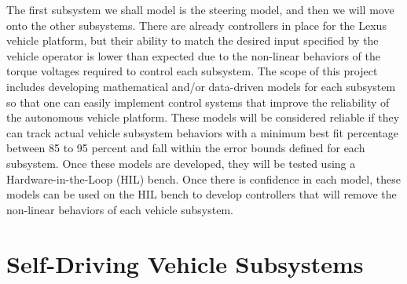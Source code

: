 \documentclass[conference]{IEEEtran}
\begin{document}
%
The first subsystem we shall model is the steering model, and then we will move onto
the other subsystems. There are already controllers in place for the Lexus
vehicle platform, but their ability to match the desired input specified by the vehicle operator
is lower than expected due to the non-linear
behaviors of the torque voltages required to control each subsystem. The scope
of this project includes developing mathematical and/or data-driven models for each subsystem so that one can easily implement control systems that improve the reliability of the
autonomous vehicle platform. These models will be considered reliable if they can track actual vehicle subsystem behaviors with a minimum best fit percentage between 85 to 95 percent and fall within the error bounds defined for each subsystem. Once these models are developed, they will be tested using a Hardware-in-the-Loop (HIL) bench.
Once there is confidence in each model, these models can be used on the HIL bench to develop controllers that will remove the non-linear behaviors of each vehicle subsystem.


\section{Self-Driving Vehicle Subsystems}
\label{sec:selfDrivingVehicleOverview}
\end{document}
